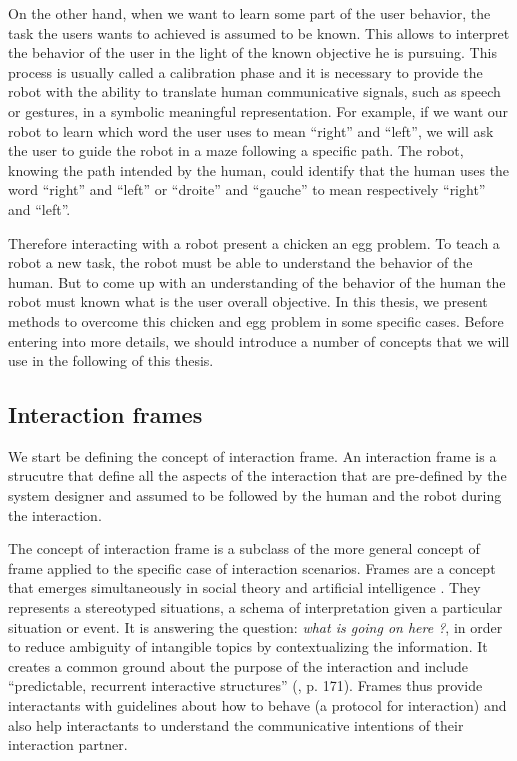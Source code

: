 On the other hand, when we want to learn some part of the user behavior, the task the users wants to achieved is assumed to be known. This allows to interpret the behavior of the user in the light of the known objective he is pursuing. This process is usually called a calibration phase and it is necessary to provide the robot with the ability to translate human communicative signals, such as speech or gestures, in a symbolic meaningful representation. For example, if we want our robot to learn which word the user uses to mean ``right'' and ``left'', we will ask the user to guide the robot in a maze following a specific path. The robot, knowing the path intended by the human, could identify that the human uses the word ``right'' and ``left'' or ``droite'' and ``gauche'' to mean respectively ``right'' and ``left''.

Therefore interacting with a robot present a chicken an egg problem. To teach a robot a new task, the robot must be able to understand the behavior of the human. But to come up with an understanding of the behavior of the human the robot must known what is the user overall objective. In this thesis, we present methods to overcome this chicken and egg problem in some specific cases. Before entering into more details, we should introduce a number of concepts that we will use in the following of this thesis.

\subsection{Interaction frames}

We start be defining the concept of interaction frame. An interaction frame is a strucutre that define all the aspects of the interaction that are pre-defined by the system designer and assumed to be followed by the human and the robot during the interaction.

The concept of interaction frame is a subclass of the more general concept of frame applied to the specific case of interaction scenarios. Frames are a concept that emerges simultaneously in social theory \cite{goffman1974frame} and artificial intelligence \cite{minsky1974framework}. They represents a stereotyped situations, a schema of interpretation given a particular situation or event. It is answering the question: \emph{what is going on here ?}, in order to reduce ambiguity of intangible topics by contextualizing the information. It creates a common ground about the purpose of the interaction \cite{tomasello2009cultural,rohlfing2013learning} and include ``predictable, recurrent interactive structures'' (\cite{ninio1996pragmatic}, p. 171). Frames thus provide interactants with guidelines about how to behave (a protocol for interaction) and also help interactants to understand the communicative intentions of their interaction partner.

